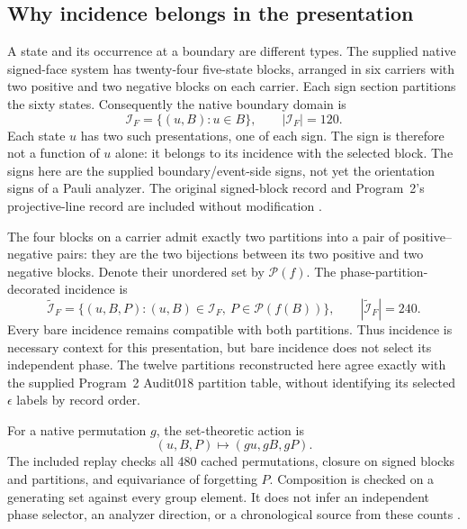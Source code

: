 \subsection*{Why incidence belongs in the presentation}
A state and its occurrence at a boundary are different types. The supplied native signed-face system has twenty-four five-state blocks, arranged in six carriers with two positive and two negative blocks on each carrier. Each sign section partitions the sixty states. Consequently the native boundary domain is
\begin{equation}
\mathcal I_F=\{(u,B):u\in B\},\qquad |\mathcal I_F|=120.
\tag{RF2}\label{eq:faceincidence}
\end{equation}
Each state $u$ has two such presentations, one of each sign. The sign is therefore not a function of $u$ alone: it belongs to its incidence with the selected block. The signs here are the supplied boundary/event-side signs, not yet the orientation signs of a Pauli analyzer. The original signed-block record and Program~2's projective-line record are included without modification \citep{cave2026nativepacket}.

The four blocks on a carrier admit exactly two partitions into a pair of positive--negative pairs: they are the two bijections between its two positive and two negative blocks. Denote their unordered set by $\mathcal P(f)$. The phase-partition-decorated incidence is
\begin{equation}
\widetilde{\mathcal I}_F=
\{(u,B,P):(u,B)\in\mathcal I_F,\ P\in\mathcal P(f(B))\},
\qquad |\widetilde{\mathcal I}_F|=240.
\tag{RF3}\label{eq:decoratedfaceincidence}
\end{equation}
Every bare incidence remains compatible with both partitions. Thus incidence is necessary context for this presentation, but bare incidence does not select its independent phase. The twelve partitions reconstructed here agree exactly with the supplied Program~2 Audit018 partition table, without identifying its selected $\epsilon$ labels by record order.

For a native permutation $g$, the set-theoretic action is
\[
(u,B,P)\longmapsto(gu,gB,gP).
\]
The included replay checks all 480 cached permutations, closure on signed blocks and partitions, and equivariance of forgetting $P$. Composition is checked on a generating set against every group element. It does not infer an independent phase selector, an analyzer direction, or a chronological source from these counts \citep{cave2026draft6replays}.

